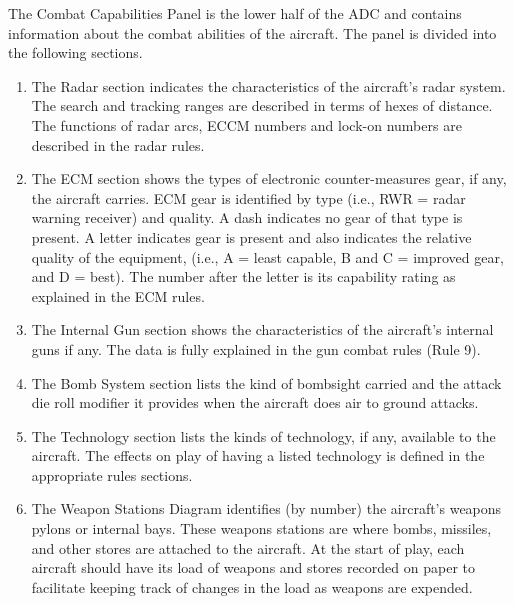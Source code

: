 The Combat Capabilities Panel is the lower half of the ADC and contains information about the combat abilities of the aircraft.  The panel is divided into the following sections.

\begin{enumerate}[resume]

    \item {} The Radar section indicates the characteristics of the aircraft's radar system. The search and tracking ranges are described in terms of hexes of distance. The functions of radar arcs, ECCM numbers and lock-on numbers are described in the radar rules.

    \item {} The ECM section shows the types of electronic counter-measures gear, if any, the aircraft carries. ECM gear is identified by type (i.e., RWR = radar warning receiver) and quality. A dash indicates no gear of that type is present. A letter indicates gear is present and also indicates the relative quality of the equipment, (i.e., A = least capable, B and C = improved gear, and D = best). The number after the letter is its capability rating as explained in the ECM rules.

    \item {} The Internal Gun section shows the characteristics of the aircraft's internal guns if any. The data is fully explained in the gun combat rules (Rule 9).

    \item {} The Bomb System section lists the kind of bombsight carried and the attack die roll modifier it provides when the aircraft does air to ground attacks.

    \item {} The Technology section lists the kinds of technology, if any, available to the aircraft. The effects on play of having a listed technology is defined in the appropriate rules sections.

    \item {} The Weapon Stations Diagram identifies (by number) the aircraft's weapons pylons or internal bays. These weapons stations are where bombs, missiles, and other stores are attached to the aircraft. At the start of play, each aircraft should have its load of weapons and stores recorded on paper to facilitate keeping track of changes in the load as weapons are expended.


\end{enumerate}
